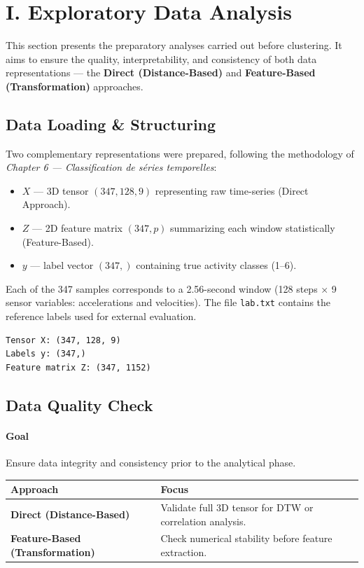 \documentclass[12pt,a4paper]{report}
\begin{document}
\chapter{I. Exploratory Data Analysis}

This section presents the preparatory analyses carried out before clustering.
It aims to ensure the quality, interpretability, and consistency of both data representations
— the \textbf{Direct (Distance-Based)} and \textbf{Feature-Based (Transformation)} approaches.

\section{Data Loading \& Structuring}
Two complementary representations were prepared, following the methodology of
\textit{Chapter 6 — Classification de séries temporelles}:

\begin{itemize}[leftmargin=1.2cm, label=--, itemsep=2pt]
    \item $X$ — 3D tensor $(347, 128, 9)$ representing raw time-series (Direct Approach).
    \item $Z$ — 2D feature matrix $(347, p)$ summarizing each window statistically (Feature-Based).
    \item $y$ — label vector $(347,)$ containing true activity classes (1–6).
\end{itemize}

Each of the 347 samples corresponds to a 2.56-second window (128 steps × 9 sensor variables: accelerations and velocities).  
The file \texttt{lab.txt} contains the reference labels used for external evaluation.

\begin{verbatim}
Tensor X: (347, 128, 9)
Labels y: (347,)
Feature matrix Z: (347, 1152)
\end{verbatim}

\section{Data Quality Check}
\subsubsection*{Goal}
Ensure data integrity and consistency prior to the analytical phase.

\begin{center}
\begin{tabularx}{\textwidth}{l X} 
\toprule
\textbf{Approach} & \textbf{Focus} \\ 
\midrule
\textbf{Direct (Distance-Based)} & Validate full 3D tensor for DTW or correlation analysis. \\
\textbf{Feature-Based (Transformation)} & Check numerical stability before feature extraction. \\
\bottomrule
\end{tabularx}
\end{center}
\end{document}
